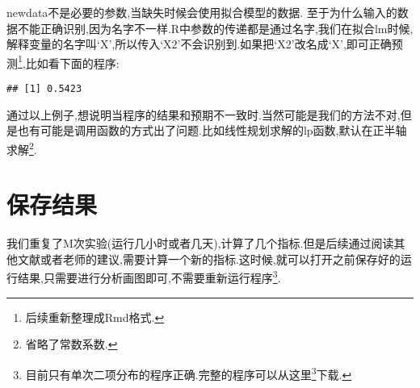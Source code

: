 \documentclass[]{ctexbook}
\newenvironment{Shaded}{\begin{snugshade}}{\end{snugshade}}
\newcommand{\DataTypeTok}[1]{\textcolor[rgb]{0.13,0.29,0.53}{#1}}
\newcommand{\DecValTok}[1]{\textcolor[rgb]{0.00,0.00,0.81}{#1}}
\newcommand{\FloatTok}[1]{\textcolor[rgb]{0.00,0.00,0.81}{#1}}
\newcommand{\KeywordTok}[1]{\textcolor[rgb]{0.13,0.29,0.53}{\textbf{#1}}}
\newcommand{\NormalTok}[1]{#1}
\newcommand{\OperatorTok}[1]{\textcolor[rgb]{0.81,0.36,0.00}{\textbf{#1}}}
\newcommand{\StringTok}[1]{\textcolor[rgb]{0.31,0.60,0.02}{#1}}
\renewcommand{\href}[2]{#2\footnote{\url{#1}}}
\begin{document}
newdata不是必要的参数,当缺失时候会使用拟合模型的数据.
至于为什么输入的数据不能正确识别,因为名字不一样.R中参数的传递都是通过名字,我们在拟合lm时候,解释变量的名字叫`X',所以传入`X2'不会识别到.如果把`X2'改名成`X',即可正确预测\footnote{后续重新整理成Rmd格式.},比如看下面的程序:

\begin{Shaded}
\end{Shaded}

\begin{verbatim}
## [1] 0.5423
\end{verbatim}

通过以上例子,想说明当程序的结果和预期不一致时.当然可能是我们的方法不对,但是也有可能是调用函数的方式出了问题.比如线性规划求解的lp函数,默认在正半轴求解\footnote{省略了常数系数.}.

\hypertarget{section-6}{%
\section{保存结果}\label{section-6}}

我们重复了M次实验(运行几小时或者几天),计算了几个指标.但是后续通过阅读其他文献或者老师的建议,需要计算一个新的指标.这时候,就可以打开之前保存好的运行结果,只需要进行分析画图即可,不需要重新运行程序\footnote{目前只有单次二项分布的程序正确.完整的程序可以从\href{code/glm.R}{这里}下载.}.
\end{document}
